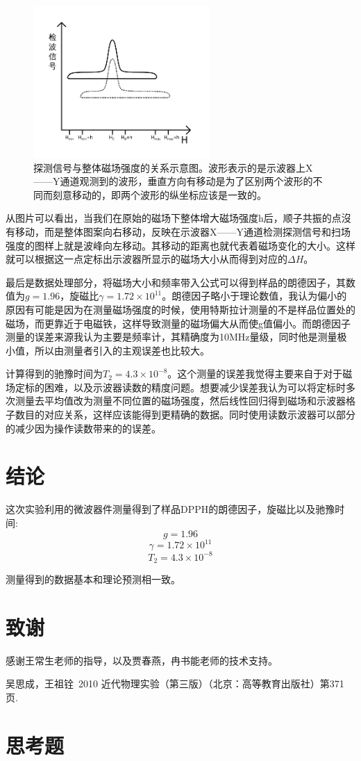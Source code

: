 \documentclass[aps,pre,12pt,preprint,onecolumn,showpacs,showkeys,UTF8]{revtex4-1}
\begin{document}
\begin{figure}[h]
	\begin{center}
		\includegraphics[width=0.6\textwidth]{pic7.png}
	\end{center}
\caption{\label{fig:exp4}探测信号与整体磁场强度的关系示意图。波形表示的是示波器上X——Y通道观测到的波形，垂直方向有移动是为了区别两个波形的不同而刻意移动的，即两个波形的纵坐标应该是一致的。}
\end{figure}

从图片可以看出，当我们在原始的磁场下整体增大磁场强度h后，顺子共振的点沒有移动，而是整体图案向右移动，反映在示波器X——Y通道检测探测信号和扫场强度的图样上就是波峰向左移动。其移动的距离也就代表着磁场变化的大小。这样就可以根据这一点定标出示波器所显示的磁场大小从而得到对应的$\Delta H$。

最后是数据处理部分，将磁场大小和频率带入公式可以得到样品的朗德因子，其数值为$g=1.96$，旋磁比$\gamma=1.72\times 10^{11}$。朗德因子略小于理论数值，我认为偏小的原因有可能是因为在测量磁场强度的时候，使用特斯拉计测量的不是样品位置处的磁场，而更靠近于电磁铁，这样导致测量的磁场偏大从而使g值偏小。而朗德因子测量的误差来源我认为主要是频率计，其精确度为10MHz量级，同时他是测量极小值，所以由测量者引入的主观误差也比较大。

计算得到的驰豫时间为$T_2=4.3\times 10^{-8}$。这个测量的误差我觉得主要来自于对于磁场定标的困难，以及示波器读数的精度问题。想要减少误差我认为可以将定标时多次测量去平均值改为测量不同位置的磁场强度，然后线性回归得到磁场和示波器格子数目的对应关系，这样应该能得到更精确的数据。同时使用读数示波器可以部分的减少因为操作读数带来的的误差。

\section{结论}

这次实验利用的微波器件测量得到了样品DPPH的朗德因子，旋磁比以及驰豫时间:
$$g=1.96$$
$$\gamma=1.72\times 10^{11}$$
$$T_2=4.3\times 10^{-8}$$

测量得到的数据基本和理论预测相一致。

\section{致谢}
感谢王常生老师的指导，以及贾春燕，冉书能老师的技术支持。



\begin{thebibliography}{}
	 吴思成，王祖铨~2010 近代物理实验（第三版）（北京：高等教育出版社）第371页.
%
%
\end{thebibliography}

\clearpage
\appendix
\section{思考题}
\end{document}
